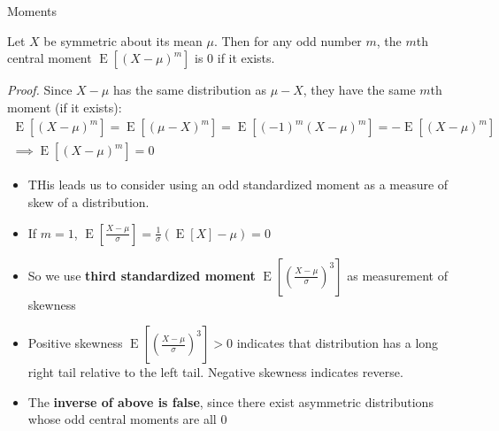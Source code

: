 \documentclass[8pt]{beamer}
\newcommand{\tb}[1]{\textbf{#1}}
\newcommand{\ti}[1]{\textit{#1}}
\newcommand{\expec}[1]{\operatorname{E}\left[ #1 \right]}
\begin{document}
\begin{frame}{Moments}
    \begin{lemma}
        Let $X$ be symmetric about its mean $\mu$. Then for any odd number $m$, the $m$th central moment $\expec{(X-\mu)^m}$ is $0$ if it exists.
    \end{lemma}

    \ti{Proof.}
    Since $X-\mu$ has the same distribution as $\mu -X$, they have the same $m$th moment (if it exists):
    \[
    \begin{gathered}
        \expec{(X-\mu)^m} = \expec{(\mu - X)^m} = \expec{(-1)^m (X -\mu)^m} = - \expec{(X - \mu)^m} \\
        \implies \expec{(X - \mu)^m} = 0
    \end{gathered}
    \]

    \begin{itemize}
        \item THis leads us to consider using an odd standardized moment as a measure of skew of a distribution.
        \item If $m = 1$, $\expec{\frac{X - \mu}{\sigma}} = \frac{1}{\sigma} (\expec{X} - \mu) = 0$
        \item So we use \tb{third standardized moment} $\expec{\left(\frac{X - \mu}{\sigma}\right)^3}$ as measurement of skewness
        \item Positive skewness $\expec{\left(\frac{X - \mu}{\sigma}\right)^3} > 0$ indicates that distribution has a long right tail relative to the left tail. Negative skewness indicates reverse.
        \item The \tb{inverse of above is false}, since there exist asymmetric distributions whose odd central moments are all $0$
    \end{itemize}
\end{frame}
\end{document}
